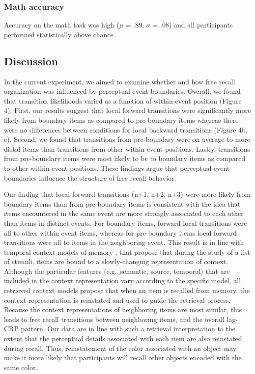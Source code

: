 \subsubsection{Math accuracy}\label{math-accuracy}

Accuracy on the math task was high (\(\mu\) = .89, \(\sigma\) = .08) and
all participants performed statistically above chance.

\subsection{Discussion}\label{discussion-2}

In the current experiment, we aimed to examine whether and how free
recall organization was influenced by perceptual event boundaries.
Overall, we found that transition likelihoods varied as a function of
within-event position (Figure 4). First, our results suggest that local
forward transitions were significantly more likely from boundary items
as compared to pre-boundary items whereas there were no differences
between conditions for local backward transitions (Figure 4b, c).
Second, we found that transitions from pre-boundary were on average to
more distal items than transitions from other within-event positions.
Lastly, transitions from pre-boundary items were most likely to be to
boundary items as compared to other within-event positions. These
findings argue that perceptual event boundaries influence the structure
of free recall behavior.

Our finding that local forward transitions (n+1, n+2, n+3) were more
likely from boundary items than from pre-boundary items is consistent
with the idea that items encountered in the same event are more strongly
associated to each other than items in distinct events. For boundary
items, forward local transitions were all to other within event items,
whereas for pre-boundary items local forward transitions were all to
items in the neighboring event. This result is in line with temporal
context models of memory
\autocites{howard_distributed_2002}{manning_oscillatory_2011}{polyn_category-specific_2005}{polyn_context_2009},
that propose that during the study of a list of stimuli, items are bound
to a slowly-changing representation of context. Although the particular
features (e.g.~semantic, source, temporal) that are included in the
context representation vary according to the specific model, all
retrieved context models propose that when an item is recalled from
memory, the context representation is reinstated and used to guide the
retrieval process. Because the context representations of neighboring
items are most similar, this leads to free recall transitions between
neighboring items, and the overall lag-CRP pattern. Our data are in line
with such a retrieval interpretation to the extent that the perceptual
details associated with each item are also reinstated during recall.
Thus, reinstatement of the color associated with an object may make it
more likely that participants will recall other objects encoded with the
same color.

